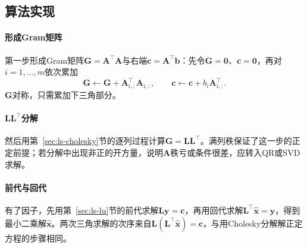 \subsection{算法实现}

\paragraph{形成Gram矩阵}
第一步形成Gram矩阵$\bm G=\bm A^\top\bm A$与右端$\bm c=\bm A^\top\bm b$：先令$\bm G=\bm0$、$\bm c=\bm0$，再对$i=1,\ldots,m$依次累加
\[
 \bm G\leftarrow\bm G+\bm A_{i,:}^\top\bm A_{i,:},\qquad
 \bm c\leftarrow\bm c+b_i\bm A_{i,:}^\top .
\]
$\bm G$对称，只需累加下三角部分。

\paragraph{\texorpdfstring{$\bm L\bm L^\top$}{LL\textasciicircum T}分解}
然后用第~\ref{sec:ls-cholesky}节的逐列过程计算$\bm G=\bm L\bm L^\top$。满列秩保证了这一步的正定前提；若分解中出现非正的开方量，说明$\bm A$秩亏或条件很差，应转入QR或SVD求解。

\paragraph{前代与回代}
有了因子，先用第~\ref{sec:ls-lu}节的前代求解$\bm L\bm y=\bm c$，再用回代求解$\bm L^\top\hat{\bm x}=\bm y$，得到最小二乘解$\hat{\bm x}$。两次三角求解的次序来自$\bm L(\bm L^\top\hat{\bm x})=\bm c$，与用Cholesky分解解正定方程的步骤相同。

